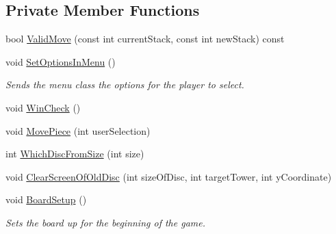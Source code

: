 \subsection*{Private Member Functions}
\begin{DoxyCompactItemize}
\item 
bool \hyperlink{classHanoi_a30dc9940db3589121396850f52ea7730}{Valid\-Move} (const int current\-Stack, const int new\-Stack) const 
\item 
void \hyperlink{classHanoi_a4dd4c6028ade2b265ce98e48c3f2fb2a}{Set\-Options\-In\-Menu} ()
\begin{DoxyCompactList}\small\item\em Sends the menu class the options for the player to select. \end{DoxyCompactList}\item 
void \hyperlink{classHanoi_aefbb40fc625506daa131076206e85b69}{Win\-Check} ()
\item 
void \hyperlink{classHanoi_a99b377a6ff0a2fc7d94d4fef0701345f}{Move\-Piece} (int user\-Selection)
\item 
int \hyperlink{classHanoi_a8ec34fb3a3682f6a8dcc1007e013ded0}{Which\-Disc\-From\-Size} (int size)
\item 
void \hyperlink{classHanoi_ad37d25d89cfdb3504d8f0702d0fff930}{Clear\-Screen\-Of\-Old\-Disc} (int size\-Of\-Disc, int target\-Tower, int y\-Coordinate)
\item 
void \hyperlink{classHanoi_a5dc7aab5bfe9d0b9d83ba75be22412e2}{Board\-Setup} ()
\begin{DoxyCompactList}\small\item\em Sets the board up for the beginning of the game. \end{DoxyCompactList}\end{DoxyCompactItemize}
